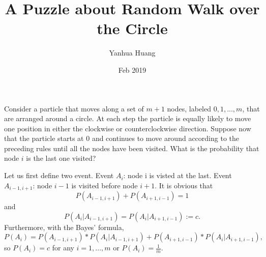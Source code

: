\documentclass[a4paper,11pt]{article}
\begin{document}
\title{A Puzzle about Random Walk over the Circle}
\author{Yanhua Huang}
\date{Feb 2019}
\maketitle

Consider a particle that moves along a set of $m + 1$ nodes, labeled $0, 1, . . . , m$, that are arranged around a circle. At each step the particle is equally likely to move one position in either the clockwise or counterclockwise direction. Suppose now that the particle starts at 0 and continues to move around according to the preceding rules until all the nodes have been visited. What is the probability that node $i$ is the last one visited?

Let us first define two event.
Event $A_i$: node i is visted at the last.
Event $A_{i-1,i+1}$: node $i-1$ is visited before node $i+1$.
It is obvious that 
\begin{equation}
P(A_{i-1,i+1}) + P(A_{i+1,i-1}) = 1
\end{equation}
and 
\begin{equation}
P(A_i|A_{i-1,i+1}) = P(A_i|A_{i+1,i-1}) := c.
\end{equation}
Furthermore, with the Bayes' formula, 
\begin{equation}
P(A_i) = P(A_{i-1,i+1}) * P(A_i|A_{i-1,i+1}) + P(A_{i+1,i-1}) * P(A_i|A_{i+1,i-1}),
\end{equation}
so $P(A_i) = c$ for any $i = 1, . . . , m$ or $P(A_i) = \frac{1}{m}$.
\end{document}
